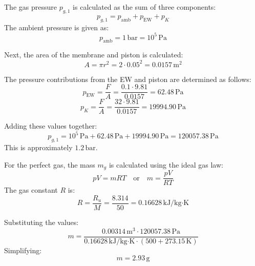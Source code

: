 The gas pressure \( p_{g,1} \) is calculated as the sum of three components:  
\[
p_{g,1} = p_{\text{amb}} + p_{\text{EW}} + p_{K}
\]  
The ambient pressure is given as:  
\[
p_{\text{amb}} = 1 \, \text{bar} = 10^5 \, \text{Pa}
\]  

Next, the area of the membrane and piston is calculated:  
\[
A = \pi r^2 = 2 \cdot 0.05^2 = 0.0157 \, \text{m}^2
\]  

The pressure contributions from the EW and piston are determined as follows:  
\[
p_{\text{EW}} = \frac{F}{A} = \frac{0.1 \cdot 9.81}{0.0157} = 62.48 \, \text{Pa}
\]  
\[
p_{K} = \frac{F}{A} = \frac{32 \cdot 9.81}{0.0157} = 19994.90 \, \text{Pa}
\]  

Adding these values together:  
\[
p_{g,1} = 10^5 \, \text{Pa} + 62.48 \, \text{Pa} + 19994.90 \, \text{Pa} = 120057.38 \, \text{Pa}
\]  
This is approximately \( 1.2 \, \text{bar} \).  

For the perfect gas, the mass \( m_g \) is calculated using the ideal gas law:  
\[
pV = mRT \quad \text{or} \quad m = \frac{pV}{RT}
\]  
The gas constant \( R \) is:  
\[
R = \frac{R_u}{M} = \frac{8.314}{50} = 0.16628 \, \text{kJ/kg·K}
\]  

Substituting the values:  
\[
m = \frac{0.00314 \, \text{m}^3 \cdot 120057.38 \, \text{Pa}}{0.16628 \, \text{kJ/kg·K} \cdot (500 + 273.15 \, \text{K})}
\]  
Simplifying:  
\[
m = 2.93 \, \text{g}
\]
